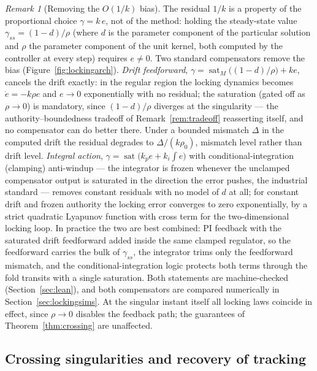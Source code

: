 \documentclass[11pt,american]{article}
\theoremstyle{definition}
\theoremstyle{plain}
\theoremstyle{remark}
\newtheorem{remark}{Remark}
\begin{document}
\begin{remark}[Removing the $O(1/k)$ bias]\label{rem:exactlocking}
The residual $1/k$ is a property of the proportional choice $\gamma = k\,e$, not of the method: holding the steady-state value $\gamma_{ss} = (1-d)/\rho$ (where $d$ is the parameter component of the particular solution and $\rho$ the parameter component of the unit kernel, both computed by the controller at every step) requires $e \ne 0$. Two standard compensators remove the bias (Figure~\ref{fig:lockingarch}). \emph{Drift feedforward}, $\gamma = \operatorname{sat}_M\!\bigl((1-d)/\rho\bigr) + k e$, cancels the drift exactly: in the regular region the locking dynamics becomes $\dot e = -k\rho e$ and $e \to 0$ exponentially with no residual; the saturation (gated off as $\rho \to 0$) is mandatory, since $(1-d)/\rho$ diverges at the singularity --- the authority--boundedness tradeoff of Remark~\ref{rem:tradeoff} reasserting itself, and no compensator can do better there. Under a bounded mismatch $\Delta$ in the computed drift the residual degrades to $\Delta/(k\rho_0)$, mismatch level rather than drift level. \emph{Integral action}, $\gamma = \operatorname{sat}\bigl(k_p e + k_i \int e\bigr)$ with conditional-integration (clamping) anti-windup --- the integrator is frozen whenever the unclamped compensator output is saturated in the direction the error pushes, the industrial standard --- removes constant residuals with no model of $d$ at all; for constant drift and frozen authority the locking error converges to zero exponentially, by a strict quadratic Lyapunov function with cross term for the two-dimensional locking loop. In practice the two are best combined: PI feedback with the saturated drift feedforward added inside the same clamped regulator, so the feedforward carries the bulk of $\gamma_{ss}$, the integrator trims only the feedforward mismatch, and the conditional-integration logic protects both terms through the fold transits with a single saturation. Both statements are machine-checked (Section~\ref{sec:lean}), and both compensators are compared numerically in Section~\ref{sec:lockingsims}. At the singular instant itself all locking laws coincide in effect, since $\rho \to 0$ disables the feedback path; the guarantees of Theorem~\ref{thm:crossing} are unaffected.
\end{remark}

\subsection{Crossing singularities and recovery of tracking}\label{sec:crossing}
\end{document}
